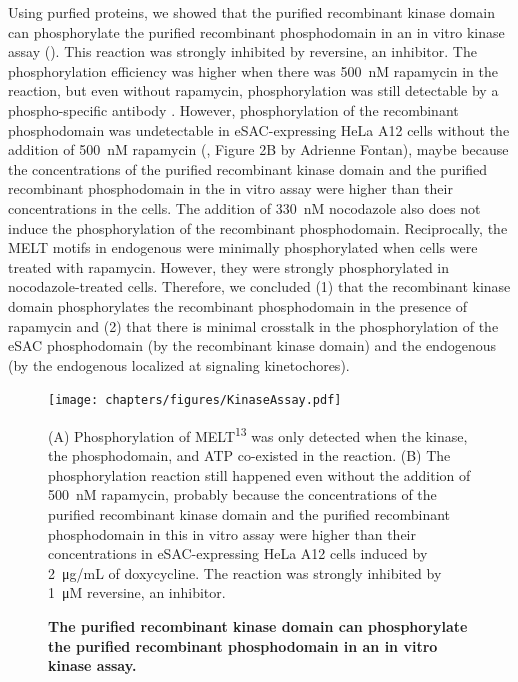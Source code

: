 Using purfied proteins, we showed that the purified recombinant  kinase domain can phosphorylate the purified recombinant  phosphodomain in an in vitro kinase assay (). This reaction was strongly inhibited by reversine, an  inhibitor. The phosphorylation efficiency was higher when there was \SI{500}{nM} rapamycin in the reaction, but even without rapamycin, phosphorylation was still detectable by a phospho-specific antibody \cite{MELTActivity}. However, phosphorylation of the recombinant phosphodomain was undetectable in eSAC-expressing HeLa A12 cells without the addition of \SI{500}{nM} rapamycin (\cite{eSAC}, Figure 2B by Adrienne Fontan), maybe because the concentrations of the purified recombinant  kinase domain and the purified recombinant  phosphodomain in the in vitro assay were higher than their concentrations in the cells. The addition of \SI{330}{nM} nocodazole also does not induce the phosphorylation of the recombinant  phosphodomain. Reciprocally, the MELT motifs in endogenous  were minimally phosphorylated when cells were treated with rapamycin. However, they were strongly phosphorylated in nocodazole-treated cells. Therefore, we concluded (1) that the recombinant  kinase domain phosphorylates the recombinant  phosphodomain in the presence of rapamycin and (2) that there is minimal crosstalk in the phosphorylation of the eSAC phosphodomain (by the recombinant  kinase domain) and the endogenous  (by the endogenous  localized at signaling kinetochores).

\begin{figure}
    \centering
    \texttt{[image: chapters/figures/KinaseAssay.pdf]}
    \caption{\textbf{The purified recombinant  kinase domain can phosphorylate the purified recombinant  phosphodomain in an in vitro kinase assay.}}
    \noindent\justifying (A) Phosphorylation of MELT\textsuperscript{13} was only detected when the kinase, the phosphodomain, and ATP co-existed in the reaction. (B) The phosphorylation reaction still happened even without the addition of \SI{500}{nM} rapamycin, probably because the concentrations of the purified recombinant  kinase domain and the purified recombinant  phosphodomain in this in vitro assay were higher than their concentrations in eSAC-expressing HeLa A12 cells induced by \SI{2}{\micro g/mL} of doxycycline. The reaction was strongly inhibited by \SI{1}{\micro M} reversine, an  inhibitor.
    \label{KinaseAssay}
\end{figure}

